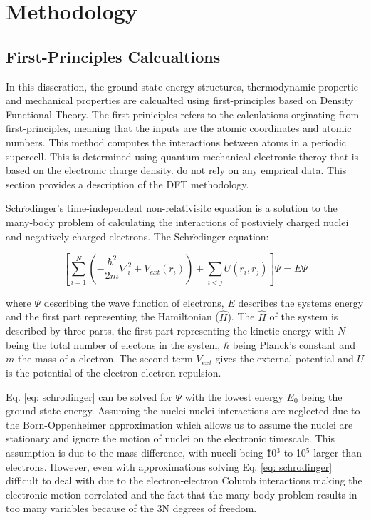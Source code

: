 \chapter{Methodology}

\section{First-Principles Calcualtions}

In this disseration, the ground state energy structures, thermodynamic propertie and mechanical properties are calcualted using first-principles based on Density Functional Theory. The first-priniciples refers to the calculations orginating from first-principles, meaning that the inputs are the atomic coordinates and atomic numbers. This method computes the interactions between atoms in a periodic supercell. This is determined using quantum mechanical electronic theroy that is based on the electronic charge density. do not rely on any emprical data. This section provides a description of the DFT methodology.

Schr$\ddot{o}$dinger's time-independent non-relativisitc equation is a solution to the many-body problem of calculating the interactions of postiviely charged nuclei and negatively charged electrons. The Schr$\ddot{o}$dinger equation:

\begin{equation}
\label{eq: schrodinger}
\left[ \sum_{i=1}^{N} \left( - \frac{\hbar^2}{2m} \nabla_{i}^2 + V_{ext} (r_{i}) \right) + \sum_{i<j} U (r_{i}, r_{j}) \right] \Psi = E \Psi
\end{equation}

\noindent where $\Psi$ describing the wave function of electrons, $E$ describes the systems energy and the first part representing the Hamiltonian ($\hat{H}$). The $\hat{H}$ of the system is described by three parts, the first part representing the kinetic energy with $N$ being the total number of electons in the system, $\hbar$ being Planck's constant and $m$ the mass of a electron. The second term $V_{ext}$ gives the external potential and $U$ is the potential of the electron-electron repulsion. 

Eq. \ref{eq: schrodinger} can be solved for $\Psi$ with the lowest energy $E_0$ being the ground state energy. Assuming the nuclei-nuclei interactions are neglected due to the Born-Oppenheimer approximation which allows us to assume the nuclei are stationary and ignore the motion of nuclei on the electronic timescale. This assumption is due to the mass difference, with nuceli being \~ 10$^3$ to 10$^5$ larger than electrons. However, even with approximations solving Eq. \ref{eq: schrodinger} difficult to deal with due to the electron-electron Columb interactions making the electronic motion correlated and the fact that the many-body problem results in too many variables because of the 3N degrees of freedom. 

